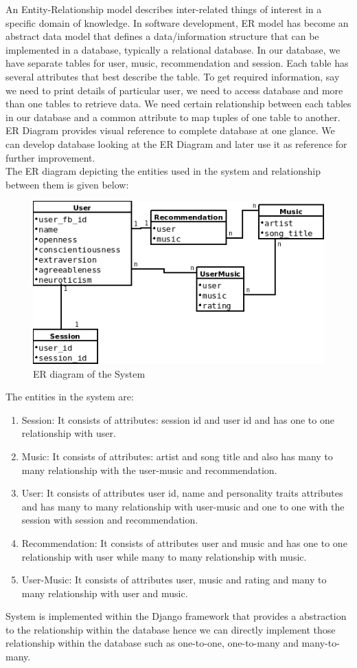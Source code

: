 An Entity-Relationship model describes inter-related things of interest in a specific domain of knowledge. In software development, ER model has become an abstract data model that defines a data/information structure that can be implemented in a database, typically a relational database. In our database, we have separate tables for user, music, recommendation and session. Each table has several attributes that best describe the table. To get required information, say we need to print details of particular user, we need to access database and more than one tables to retrieve data. We need certain relationship between each tables in our database and a common attribute to map tuples of one table to another. ER Diagram provides visual reference to complete database at one glance. We can develop database looking at the ER Diagram and later use it as reference for further improvement. 
\\
The  ER diagram depicting the entities used in the system and relationship between them is given below:
\begin{figure}[!ht]
\centering
\includegraphics[width = 10 cm]{fig/er.png}
\caption{ER diagram of the System}
\label{fig:er}
\end{figure}
The entities in the system are:
\begin{enumerate}
	\item Session: It consists of attributes: session id and user id and has one to one relationship with user.
	\item Music: It consists of attributes: artist and song title and also has  many to many relationship with the user-music and recommendation.
	\item User: It consists of attributes user id, name and personality traits attributes and has  many to  many relationship with user-music and one to one with the session with session and recommendation.
	\item Recommendation: It consists of attributes user and music and has one to one relationship with user while many to many relationship with music.

	\item User-Music: It consists of attributes user, music and rating and many to many relationship with user and music.
\end{enumerate}
System is implemented within the Django framework that provides a abstraction to the relationship within the database hence we can directly implement those relationship within the database such as one-to-one, one-to-many and many-to-many.
